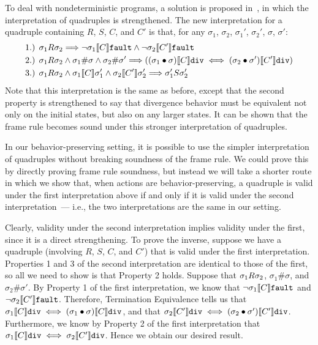 To deal with nondeterministic programs, a solution is proposed in~\cite{yang07}, in which the interpretation of
quadruples is strengthened. The new interpretation for a quadruple containing $R$, $S$, $C$, and $C'$ is that,
for any $\sigma_1$, $\sigma_2$, $\sigma_1'$, $\sigma_2'$, $\sigma$, $\sigma'$:
\begin{align*}
& \text{1.) } \relate{R}{\sigma_1}{\sigma_2} \Longrightarrow 
\lnot \relate{\den{C}}{\sigma_1}{\fault} \land \lnot \relate{\den{C'}}{\sigma_2}{\fault} \\
& \text{2.) } \relate{R}{\sigma_1}{\sigma_2} \land \sigma_1 \# \sigma \land \sigma_2 \# \sigma' \Longrightarrow (\relate{\den{C}}{(\sigma_1 \dt \sigma)}{\dvg} \iff \relate{\den{C'}}{(\sigma_2 \dt \sigma')}{\dvg}) \\
& \text{3.) } \relate{R}{\sigma_1}{\sigma_2} \land \relate{\den{C}}{\sigma_1}{\sigma_1'} \land \relate{\den{C'}}{\sigma_2}{\sigma_2'} 
\Longrightarrow \relate{S}{\sigma_1'}{\sigma_2'}
\end{align*}
Note that this interpretation is the same as before, except that the second property is strengthened to 
say that divergence behavior must be equivalent not only on the initial states, but also on any larger
states. It can be shown that the frame rule becomes sound under this stronger interpretation of quadruples.

In our behavior-preserving setting, it is possible to use the simpler interpretation of quadruples without
breaking soundness of the frame rule. We could prove this by directly proving frame rule soundness, but
instead we will take a shorter route in which we show that, when actions are behavior-preserving, a 
quadruple is valid under the first interpretation above if and only if it is valid under the second
interpretation~--- i.e., the two interpretations are the same in our setting. 

Clearly, validity under the second interpretation implies validity under the first, since it is a
direct strengthening. To prove the inverse, suppose we have a quadruple (involving $R$, $S$, $C$, and $C'$)
that is valid under the first interpretation. Properties 1 and 3 of the second interpretation are 
identical to those of the first, so all we need to show is that Property 2 holds. Suppose that 
$\relate{R}{\sigma_1}{\sigma_2}$, $\sigma_1 \# \sigma$, and $\sigma_2 \# \sigma'$. By Property
1 of the first interpretation, we know that $\lnot \relate{\den{C}}{\sigma_1}{\fault}$ and
$\lnot \relate{\den{C'}}{\sigma_2}{\fault}$. Therefore, Termination Equivalence tells us that
$\relate{\den{C}}{\sigma_1}{\dvg} \iff \relate{\den{C}}{(\sigma_1 \dt \sigma)}{\dvg}$, and that
$\relate{\den{C'}}{\sigma_2}{\dvg} \iff \relate{\den{C'}}{(\sigma_2 \dt \sigma')}{\dvg}$.
Furthermore, we know by Property 2 of the first interpretation that 
$\relate{\den{C}}{\sigma_1}{\dvg} \iff \relate{\den{C'}}{\sigma_2}{\dvg}$. Hence we obtain
our desired result.


